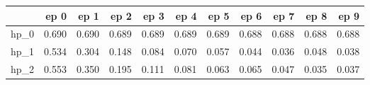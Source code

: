 \begin{tabular}{lrrrrrrrrrr}
\toprule
{} &   ep 0 &   ep 1 &   ep 2 &   ep 3 &   ep 4 &   ep 5 &   ep 6 &   ep 7 &   ep 8 &   ep 9 \\
\midrule
hp\_0 &  0.690 &  0.690 &  0.689 &  0.689 &  0.689 &  0.689 &  0.688 &  0.688 &  0.688 &  0.688 \\
hp\_1 &  0.534 &  0.304 &  0.148 &  0.084 &  0.070 &  0.057 &  0.044 &  0.036 &  0.048 &  0.038 \\
hp\_2 &  0.553 &  0.350 &  0.195 &  0.111 &  0.081 &  0.063 &  0.065 &  0.047 &  0.035 &  0.037 \\
\bottomrule
\end{tabular}
